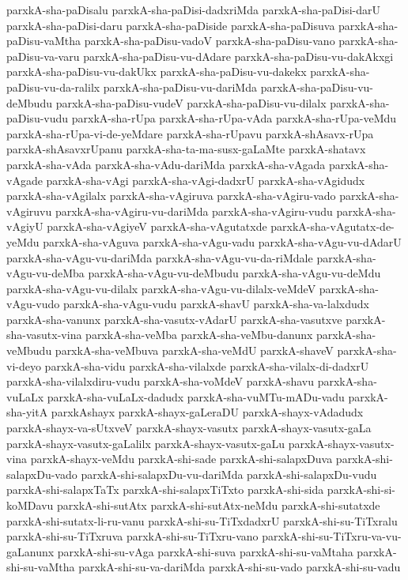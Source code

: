 {parxkA-sha-paDisalu
parxkA-sha-paDisi-dadxriMda
parxkA-sha-paDisi-darU
parxkA-sha-paDisi-daru
parxkA-sha-paDiside
parxkA-sha-paDisuva
parxkA-sha-paDisu-vaMtha
parxkA-sha-paDisu-vadoV
parxkA-sha-paDisu-vano
parxkA-sha-paDisu-va-varu
parxkA-sha-paDisu-vu-dAdare
parxkA-sha-paDisu-vu-dakAkxgi
parxkA-sha-paDisu-vu-dakUkx
parxkA-sha-paDisu-vu-dakekx
parxkA-sha-paDisu-vu-da-ralilx
parxkA-sha-paDisu-vu-dariMda
parxkA-sha-paDisu-vu-deMbudu
parxkA-sha-paDisu-vudeV
parxkA-sha-paDisu-vu-dilalx
parxkA-sha-paDisu-vudu
parxkA-sha-rUpa
parxkA-sha-rUpa-vAda
parxkA-sha-rUpa-veMdu
parxkA-sha-rUpa-vi-de-yeMdare
parxkA-sha-rUpavu
parxkA-shAsavx-rUpa
parxkA-shAsavxrUpanu
parxkA-sha-ta-ma-susx-gaLaMte
parxkA-shatavx
parxkA-sha-vAda
parxkA-sha-vAdu-dariMda
parxkA-sha-vAgada
parxkA-sha-vAgade
parxkA-sha-vAgi
parxkA-sha-vAgi-dadxrU
parxkA-sha-vAgidudx
parxkA-sha-vAgilalx
parxkA-sha-vAgiruva
parxkA-sha-vAgiru-vado
parxkA-sha-vAgiruvu
parxkA-sha-vAgiru-vu-dariMda
parxkA-sha-vAgiru-vudu
parxkA-sha-vAgiyU
parxkA-sha-vAgiyeV
parxkA-sha-vAgutatxde
parxkA-sha-vAgutatx-de-yeMdu
parxkA-sha-vAguva
parxkA-sha-vAgu-vadu
parxkA-sha-vAgu-vu-dAdarU
parxkA-sha-vAgu-vu-dariMda
parxkA-sha-vAgu-vu-da-riMdale
parxkA-sha-vAgu-vu-deMba
parxkA-sha-vAgu-vu-deMbudu
parxkA-sha-vAgu-vu-deMdu
parxkA-sha-vAgu-vu-dilalx
parxkA-sha-vAgu-vu-dilalx-veMdeV
parxkA-sha-vAgu-vudo
parxkA-sha-vAgu-vudu
parxkA-shavU
parxkA-sha-va-lalxdudx
parxkA-sha-vanunx
parxkA-sha-vasutx-vAdarU
parxkA-sha-vasutxve
parxkA-sha-vasutx-vina
parxkA-sha-veMba
parxkA-sha-veMbu-danunx
parxkA-sha-veMbudu
parxkA-sha-veMbuva
parxkA-sha-veMdU
parxkA-shaveV
parxkA-sha-vi-deyo
parxkA-sha-vidu
parxkA-sha-vilalxde
parxkA-sha-vilalx-di-dadxrU
parxkA-sha-vilalxdiru-vudu
parxkA-sha-voMdeV
parxkA-shavu
parxkA-sha-vuLaLx
parxkA-sha-vuLaLx-dadudx
parxkA-sha-vuMTu-mADu-vadu
parxkA-sha-yitA
parxkAshayx
parxkA-shayx-gaLeraDU
parxkA-shayx-vAdadudx
parxkA-shayx-va-sUtxveV
parxkA-shayx-vasutx
parxkA-shayx-vasutx-gaLa
parxkA-shayx-vasutx-gaLalilx
parxkA-shayx-vasutx-gaLu
parxkA-shayx-vasutx-vina
parxkA-shayx-veMdu
parxkA-shi-sade
parxkA-shi-salapxDuva
parxkA-shi-salapxDu-vado
parxkA-shi-salapxDu-vu-dariMda
parxkA-shi-salapxDu-vudu
parxkA-shi-salapxTaTx
parxkA-shi-salapxTiTxto
parxkA-shi-sida
parxkA-shi-si-koMDavu
parxkA-shi-sutAtx
parxkA-shi-sutAtx-neMdu
parxkA-shi-sutatxde
parxkA-shi-sutatx-li-ru-vanu
parxkA-shi-su-TiTxdadxrU
parxkA-shi-su-TiTxralu
parxkA-shi-su-TiTxruva
parxkA-shi-su-TiTxru-vano
parxkA-shi-su-TiTxru-va-vu-gaLanunx
parxkA-shi-su-vAga
parxkA-shi-suva
parxkA-shi-su-vaMtaha
parxkA-shi-su-vaMtha
parxkA-shi-su-va-dariMda
parxkA-shi-su-vado
parxkA-shi-su-vadu
}
